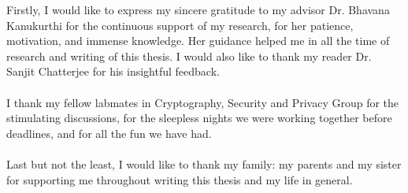 Firstly, I would like to express my sincere gratitude to my advisor Dr. Bhavana Kanukurthi for the continuous support of my research, for her patience, motivation, and immense knowledge. Her guidance helped me in all the time of research and writing of this thesis. I would also like to thank my reader Dr. Sanjit Chatterjee for his insightful feedback.
\\ \\
I thank my fellow labmates in Cryptography, Security and Privacy Group for the stimulating discussions, for the sleepless nights we were working together before deadlines, and for all the fun we have had.
\\ \\
Last but not the least, I would like to thank my family: my parents and my sister for supporting me throughout writing this thesis and my life in general.